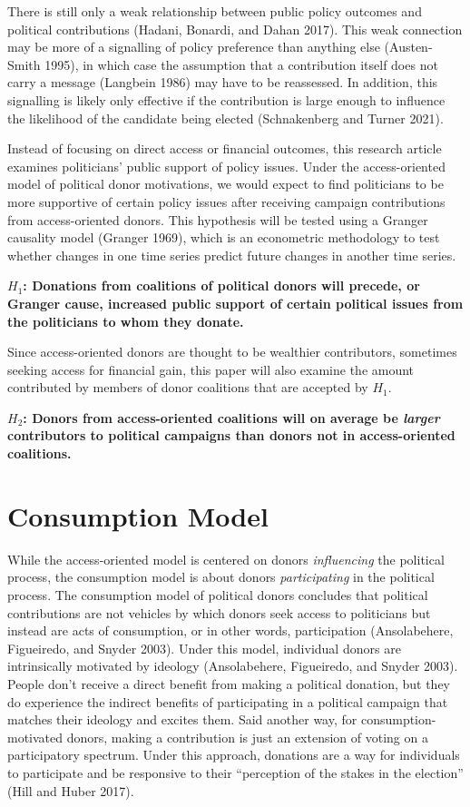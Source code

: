 \documentclass[12pt,]{article}
\begin{document}
There is still only a weak relationship between public policy outcomes
and political contributions (Hadani, Bonardi, and Dahan 2017). This weak
connection may be more of a signalling of policy preference than
anything else (Austen-Smith 1995), in which case the assumption that a
contribution itself does not carry a message (Langbein 1986) may have to
be reassessed. In addition, this signalling is likely only effective if
the contribution is large enough to influence the likelihood of the
candidate being elected (Schnakenberg and Turner 2021).

Instead of focusing on direct access or financial outcomes, this
research article examines politicians' public support of policy issues.
Under the access-oriented model of political donor motivations, we would
expect to find politicians to be more supportive of certain policy
issues after receiving campaign contributions from access-oriented
donors. This hypothesis will be tested using a Granger causality model
(Granger 1969), which is an econometric methodology to test whether
changes in one time series predict future changes in another time
series.

\textbf{\(H_{1}\): Donations from coalitions of political donors will
precede, or Granger cause, increased public support of certain political
issues from the politicians to whom they donate.}

Since access-oriented donors are thought to be wealthier contributors,
sometimes seeking access for financial gain, this paper will also
examine the amount contributed by members of donor coalitions that are
accepted by \(H_{1}\).

\textbf{\(H_{2}\): Donors from access-oriented coalitions will on
average be \emph{larger} contributors to political campaigns than donors
not in access-oriented coalitions.}

\hypertarget{consumption-model}{%
\section{Consumption Model}\label{consumption-model}}

While the access-oriented model is centered on donors \emph{influencing}
the political process, the consumption model is about donors
\emph{participating} in the political process. The consumption model of
political donors concludes that political contributions are not vehicles
by which donors seek access to politicians but instead are acts of
consumption, or in other words, participation (Ansolabehere, Figueiredo,
and Snyder 2003). Under this model, individual donors are intrinsically
motivated by ideology (Ansolabehere, Figueiredo, and Snyder 2003).
People don't receive a direct benefit from making a political donation,
but they do experience the indirect benefits of participating in a
political campaign that matches their ideology and excites them. Said
another way, for consumption-motivated donors, making a contribution is
just an extension of voting on a participatory spectrum. Under this
approach, donations are a way for individuals to participate and be
responsive to their ``perception of the stakes in the election'' (Hill
and Huber 2017).
\end{document}
